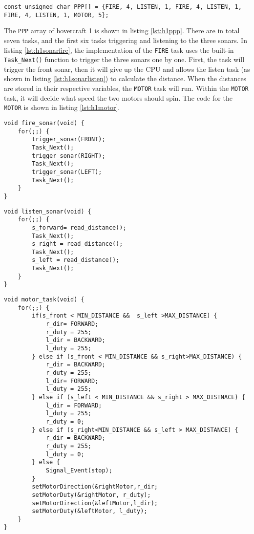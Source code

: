 \begin{lstlisting}[float=th,label=lst:h1ppp,
                   caption={\texttt{PPP} array for hovercraft 1}]
const unsigned char PPP[] = {FIRE, 4, LISTEN, 1, FIRE, 4, LISTEN, 1, FIRE, 4, LISTEN, 1, MOTOR, 5};
\end{lstlisting}
The \texttt{PPP} array of hovercraft 1 is shown in listing \ref{lst:h1ppp}.
There are in total seven tasks, and the first six tasks triggering and listening
to the three sonars. In listing \ref{lst:h1sonarfire}, the implementation of the
\texttt{FIRE} task uses the built-in \texttt{Task\_Next()} function to trigger
the three sonars one by one. First, the task will trigger the front sonar, then
it will give up the CPU and allows the listen task (as shown in listing
\ref{lst:h1sonarlisten}) to calculate the distance. When the distances are
stored in their respective variables, the \texttt{MOTOR} task will run. Within
the \texttt{MOTOR} task, it will decide what speed the two motors should spin.
The code for the \texttt{MOTOR} is shown in listing \ref{lst:h1motor}.

\begin{lstlisting}[float=thp,label=lst:h1sonarfire,
                   caption={\texttt{FIRE} Task}]
void fire_sonar(void) {
	for(;;) {
		trigger_sonar(FRONT);
		Task_Next();
		trigger_sonar(RIGHT);
		Task_Next();
		trigger_sonar(LEFT);
		Task_Next();
	}
}
\end{lstlisting}

\begin{lstlisting}[label=lst:h1sonarlisten,float=tbh,
                   caption={\texttt{LISTEN} Task}]
void listen_sonar(void) {
	for(;;)	{
	    s_forward= read_distance();
	    Task_Next();
	    s_right = read_distance();
	    Task_Next();
	    s_left = read_distance();
	    Task_Next();
	}
}
\end{lstlisting}

\begin{lstlisting}[label=lst:h1motor,float=th,
                   caption={\texttt{MOTOR} Task}]
void motor_task(void) {
	for(;;) {
    	if(s_front < MIN_DISTANCE &&  s_left >MAX_DISTANCE) {
            r_dir= FORWARD;
            r_duty = 255;
            l_dir = BACKWARD;
            l_duty = 255;
   		} else if (s_front < MIN_DISTANCE && s_right>MAX_DISTANCE) {
            r_dir = BACKWARD;
            r_duty = 255;
            l_dir= FORWARD;
            l_duty = 255;					
    	} else if (s_left < MIN_DISTANCE && s_right > MAX_DISTNACE) {
            l_dir = FORWARD;
            l_duty = 255;
            r_duty = 0;
   	 	} else if (s_right<MIN_DISTANCE && s_left > MAX_DISTANCE) {
            r_dir = BACKWARD;
            r_duty = 255;
            l_duty = 0;
    	} else {
            Signal_Event(stop);
    	}
        setMotorDirection(&rightMotor,r_dir;
        setMotorDuty(&rightMotor, r_duty);
        setMotorDirection(&leftMotor,l_dir);
        setMotorDuty(&leftMotor, l_duty);
	}
}
\end{lstlisting}

